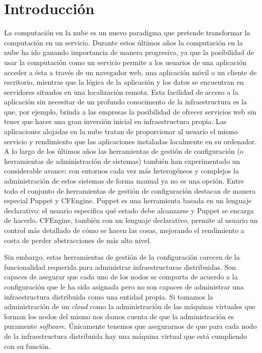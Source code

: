 \chapter{Introducción}
\label{cap:introduccion}


La computación en la nube es un nuevo paradigma que pretende transformar la computación en un servicio. Durante estos últimos años la computación en la nube ha ido ganando importancia de manera progresiva, ya que la posibilidad de usar la computación como un servicio permite a los usuarios de una aplicación acceder a ésta a través de un navegador web, una aplicación móvil o un cliente de escritorio, mientras que la lógica de la aplicación y los datos se encuentran en servidores situados en una localización remota. Esta facilidad de acceso a la aplicación sin necesitar de un profundo conocimento de la infraestructura es la que, por ejemplo, brinda a las empresas la posibilidad de ofrecer servicios web sin tener que hacer una gran inversión inicial en infraestructura propia. Las aplicaciones alojadas en la nube tratan de proporcionar al usuario el mismo servicio y rendimiento que las aplicaciones instaladas localmente en su ordenador.\\

A lo largo de los últimos años las herramientas de gestión de configuración (o herramientas de administración de sistemas) también han experimentado un considerable avance: con entornos cada vez más heterogéneos y complejos la administración de estos sistemas de forma manual ya no es una opción. Entre todo el conjunto de herramientas de gestión de configuración destacan de manera especial Puppet \cite{puppetlabs} y CFEngine. Puppet es una herramienta basada en un lenguaje declarativo: el usuario especifica qué estado debe alcanzarse y Puppet se encarga de hacerlo. CFEngine, también con un lenguaje declarativo, permite al usuario un control más detallado de cómo se hacen las cosas, mejorando el rendimiento a costa de perder abstracciones de más alto nivel.

Sin embargo, estas herramientas de gestión de la configuración carecen de la funcionalidad requerida para administrar infraestructuras distribuidas. Son capaces de asegurar que cada uno de los nodos se comporta de acuerdo a la configuración que le ha sido asignada pero no son capaces de administrar una infraestructura distribuida como una entidad propia. Si tomamos la administración de un \emph{cloud} como la administración de las máquinas virtuales que forman los nodos del mismo nos damos cuenta de que la administración es puramente \emph{software}. Únicamente tenemos que asegurarnos de que para cada nodo de la infraestructura distribuida hay una máquina virtual que está cumpliendo con su función.\\

